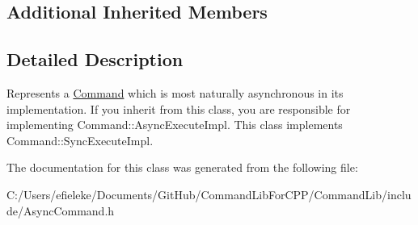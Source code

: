 \subsection*{Additional Inherited Members}


\subsection{Detailed Description}
Represents a \mbox{\hyperlink{class_command_lib_1_1_command}{Command}} which is most naturally asynchronous in its implementation. If you inherit from this class, you are responsible for implementing Command\+::\+Async\+Execute\+Impl. This class implements Command\+::\+Sync\+Execute\+Impl. 



The documentation for this class was generated from the following file\+:\begin{DoxyCompactItemize}
\item 
C\+:/\+Users/efieleke/\+Documents/\+Git\+Hub/\+Command\+Lib\+For\+C\+P\+P/\+Command\+Lib/include/Async\+Command.\+h\end{DoxyCompactItemize}
